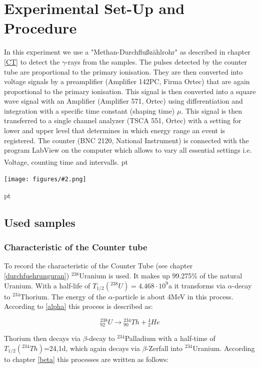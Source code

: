 \documentclass[12pt]{article}
\newcommand{\gra}[3][0.7]{
	\begin{minipage}[h!]{\textwidth}
		\centering
		\texttt{[image: figures/\#2.png]}
		\captionof{figure}{#3}
	\end{minipage}
	\vskip 30 pt
	}
\begin{document}
 

 

 
\newpage
\section{Experimental Set-Up and Procedure }
In this experiment we use a "Methan-Durchflußzählrohr" as described in chapter \ref{CT} to detect the $\gamma$-rays from the samples.
The pulses detected by the counter tube are proportional to the primary ionisation. They are then converted into voltage signals by a preamplifier (Amplifier 142PC, Firma Ortec) that are again proportional to the primary ionisation. This signal is then converted into a square wave signal with an Amplifier (Amplifier 571, Ortec) using differentiation and integration with a specific time constant (shaping time) $\mu$. This signal is then transferred to a single channel analyzer (TSCA 551, Ortec) with a setting for lower and upper level that determines in which energy range an event is registered. The counter (BNC 2120, National Instrument) is connected with  the program LabView on the computer which allows to vary all essential settings i.e. Voltage, counting time and intervalls.\textsuperscript{\cite{anleitung}}
 pt
\gra[0.8]{Versuchsaufbau}{Experimental Set-Up \textsuperscript{\cite{staat}}}
\subsection{Used samples}

\subsubsection{Characteristic of the Counter tube}\label{uranium}
To record the characteristic of the Counter Tube (see chapter \ref{durchfuehrunguran}) ${}^{238}$Uranium is used. It makes up 99.275\% of the natural Uranium.
With a half-life of $T_{1/2}({}^{238}U)=4.468\cdot 10^9$a it transforms via  $\alpha$-decay to ${}^{234}$Thorium. The energy of the $\alpha$-particle is about 4MeV in this process. According to \ref{alpha} this process is described as:

\[{}^{238}_{92}U \rightarrow {}^{234}_{90}Th + {}^4_2He\]

Thorium then decays via $\beta$-decay  to ${}^{234}$Palladium with a half-time of  $T_{1/2}({}^{234}Th)$=24,1d, which again decays via  $\beta$-Zerfall into ${}^{234}$Uranium. According to chapter \ref{beta} this processes are written as follows:
\end{document}
